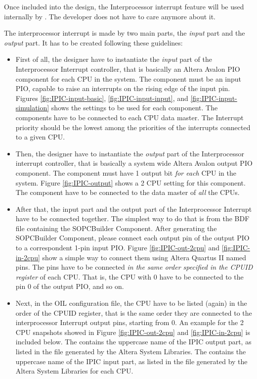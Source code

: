 Once included into the design, the Interprocessor interrupt feature
will be used internally by \ee. The developer does not have to care
anymore about it.

The interprocessor interrupt is made by two main parts, the {\em
input} part and the {\em output} part. It has to be created following
these guidelines:




\begin{itemize}

\item First of all, the designer have to instantiate the {\em input}
  part of the Interprocessor Interrupt controller, that is basically
  an Altera Avalon PIO component for each CPU in the system. The
  component must be an input PIO, capable to raise an interrupts on
  the rising edge of the input pin. Figures
  \ref{fig:IPIC-input-basic}, \ref{fig:IPIC-input-input}, and
  \ref{fig:IPIC-input-simulation} shows the settings to be used for
  each component. The components have to be connected to each CPU data
  master. The Interrupt priority should be the lowest among the
  priorities of the interrupts connected to a given CPU.

\item Then, the designer have to instantiate the {\em output} part of
  the Interprocessor interrupt controller, that is basically a
  system wide Altera Avalon output PIO component. The component must
  have 1 output bit {\em for each} CPU in the system. Figure
  \ref{fig:IPIC-output} shows a 2 CPU setting for this component. The
  component have to be connected to the data master of {\em all} the
  CPUs.

\item After that, the input part and the output part of the
  Interprocessor Interrupt have to be connected together. The simplest
  way to do that is from the BDF file containing the SOPCBuilder
  Component. After generating the SOPCBuilder Component, please
  connect each output pin of the output PIO to a correspondent 1-pin
  input PIO. Figure \ref{fig:IPIC-out-2cpu} and \ref{fig:IPIC-in-2cpu}
  show a simple way to connect them using Altera Quartus II named
  pins. The pins have to be connected {\em in the same order specified
  in the CPUID register} of each CPU. That is, the CPU with
   0 have to be connected to the pin 0 of the output PIO,
  and so on.

\item Next, in the OIL configuration file, the CPU have to be listed
  (again) in the order of the CPUID register, that is the same order
  they are connected to the interprocessor Interrupt output pins,
  starting from 0. An example for the 2 CPU snapshots showed in
  Figure \ref{fig:IPIC-out-2cpu} and \ref{fig:IPIC-in-2cpu} is
  included below. The  contains the uppercase
  name of the IPIC output part, as listed in the  file
  generated by the Altera System Libraries.  The
   contains the uppercase name of the IPIC
  input part, as listed in the  file generated by the
  Altera System Libraries for each CPU.


\end{itemize}
